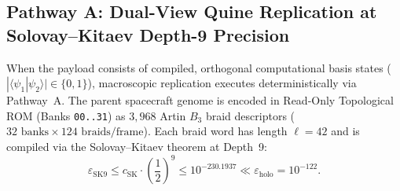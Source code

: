 \documentclass[11pt,onecolumn]{article}
\begin{document}
\subsection{Pathway A: Dual-View Quine Replication at Solovay--Kitaev Depth-9 Precision}
When the payload consists of compiled, orthogonal computational basis states ($|\langle\psi_1|\psi_2\rangle| \in \{0, 1\}$), macroscopic replication executes deterministically via Pathway~A. The parent spacecraft genome is encoded in Read-Only Topological ROM (Banks \texttt{00..31}) as $3{,}968$ Artin $B_3$ braid descriptors ($32\text{ banks} \times 124\text{ braids/frame}$). Each braid word has length $\ell = 42$ and is compiled via the Solovay--Kitaev theorem at Depth~9:
\begin{equation}
\varepsilon_{\text{SK9}} \le c_{\text{SK}} \cdot \left(\frac{1}{2}\right)^{9} \le 10^{-230.1937} \ll \varepsilon_{\text{holo}} = 10^{-122}.
\label{eq:sk9_precision}
\end{equation}
\end{document}
